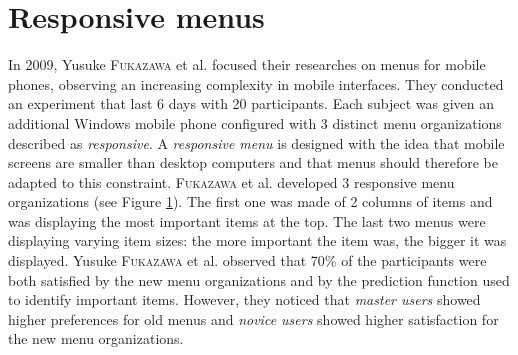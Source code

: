 \section{Responsive menus}
In 2009, Yusuke \textsc{Fukazawa} et al. \cite{fukazawa} focused their 
researches on 
menus for mobile phones, observing an increasing complexity in mobile 
interfaces. They conducted an experiment that last 6 days with 20 participants. 
Each subject was given an additional Windows mobile phone configured with 3 
distinct menu organizations described as \textit{responsive}. A 
\textit{responsive menu} is designed with the idea that mobile screens are 
smaller than desktop computers and that menus should therefore be adapted to 
this constraint. \textsc{Fukazawa} et al. developed 3 responsive menu 
organizations (see Figure \ref{fig:fukazawa_menus}). The first one was made of 
2 columns of items and was displaying the most important items at the top. The 
last two menus were displaying varying item sizes: the more important the item 
was, the bigger it was displayed. Yusuke \textsc{Fukazawa} et al. observed that 
70\% of the participants were both satisfied by the new menu organizations and 
by the prediction function used to identify important items. However, they 
noticed that \textit{master users} showed higher preferences for old menus 
and \textit{novice users} showed higher satisfaction for the new 
menu organizations.\newline

\begin{figure}[!ht]
    
    \label{fig:fukazawa_menus}
\end{figure}

